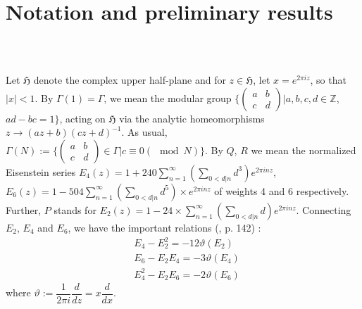 \section{Notation and preliminary results}\label{art8-sec1}\pageoriginale
~

\subsection{}\label{art8-sec1.1}
Let $\mathfrak{H}$ denote the complex upper half-plane and for $z\in \mathfrak{H}$, let $x=e^{2\pi iz}$, so that $|x|<1$. By $\Gamma(1)=\Gamma$, we mean the modular group $\{\left(\begin{smallmatrix} a & b\\ c & d\end{smallmatrix}\right) |a,b,c,d\in \mathbb{Z}$, $ad-bc=1\}$, acting on $\mathfrak{H}$ via the analytic homeomorphisms $z\to (az+b)(cz+d)^{-1}$. As usual, $\Gamma(N):=\{\left(\begin{smallmatrix} a & b\\ c & d\end{smallmatrix}\right)\in \Gamma |c\equiv 0(\mod N)\}$. By $Q$, $R$ we mean the normalized Eisenstein series $E_{4}(z)=1+240\sum\limits^{\infty}_{n=1}\left(\sum\limits_{0<d|n}d^{3}\right)e^{2\pi inz}$, $E_{6}(z)=1-504\sum\limits^{\infty}_{n=1}\left(\sum\limits_{0<d|n}d^{5}\right)\times e^{2\pi inz}$ of weights 4 and 6 respectively. Further, $P$ stands for $E_{2}(z)=1-24\times \sum\limits^{\infty}_{n=1}\left(\sum\limits_{0<d|n}d\right)e^{2\pi inz}$. Connecting $E_{2}$, $E_{4}$ and $E_{6}$, we have the important relations (\cite{art8-key9}, p. 142) :
\begin{equation}
\begin{split}
& E_{4}-E^{2}_{2}=-12\vartheta (E_{2})\\
& E_{6}-E_{2}E_{4}=-3\vartheta (E_{4})\\
& E^{2}_{4}-E_{2}E_{6}=-2\vartheta (E_{6})
\end{split}\label{art8-eq1}
\end{equation}
where $\vartheta := \dfrac{1}{2\pi i}\dfrac{d}{dz}=x\dfrac{d}{dx}$.

\smallskip

